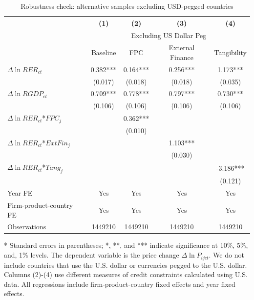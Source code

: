 \documentclass[12pt]{article}
\begin{document}
\begin{table}[htbp]
	\centering
	\caption{Robustness check: alternative samples excluding USD-pegged countries}
	\begin{threeparttable}
	\begin{tabular}{lcccc}
		\toprule
		& (1)   & (2)   & (3)   & (4) \\
		\midrule
		& \multicolumn{4}{c}{Excluding US Dollar Peg} \\
		& Baseline & FPC   & External Finance & Tangibility \\
		\midrule
		$\Delta \ln RER_{ct}$ & 0.382*** & 0.164*** & 0.256*** & 1.173*** \\
		& (0.017) & (0.018) & (0.018) & (0.035) \\
		$\Delta \ln RGDP_{ct}$ & 0.709*** & 0.778*** & 0.797*** & 0.730*** \\
		& (0.106) & (0.106) & (0.106) & (0.106) \\
		$\Delta \ln RER_{ct}$*$FPC_{j}$ &       & 0.362*** &       & \\
		&       & (0.010) &       &  \\
		$\Delta \ln RER_{ct}$*$ExtFin_{j}$ &       &       & 1.103*** &  \\
		&       &       & (0.030) &  \\
		$\Delta \ln RER_{ct}$*$Tang_{j}$ &       &       &       & -3.186*** \\
		&       &       &       & (0.121) \\
		Year FE  &   Yes    & Yes   & Yes   & Yes \\
		Firm-product-country FE &   Yes    & Yes   & Yes   & Yes \\
		Observations & 1449210 & 1449210 & 1449210 & 1449210 \\
		\bottomrule
	\end{tabular}
	\begin{tablenotes}
		\footnotesize
		\item[*] Standard errors in parentheses; *, **, and *** indicate significance at 10\%, 5\%, and, 1\% levels. The dependent variable is the price change $\Delta \ln P_{ijct}$. We do not include countries that use the U.S. dollar or currencies pegged to the U.S. dollar. Columns (2)-(4) use different measures of credit constraints calculated using U.S. data. All regressions include firm-product-country fixed effects and year fixed effects.
	\end{tablenotes}
        \end{threeparttable}
        \label{tab.robust.nopeg}
\end{table}
\end{document}
